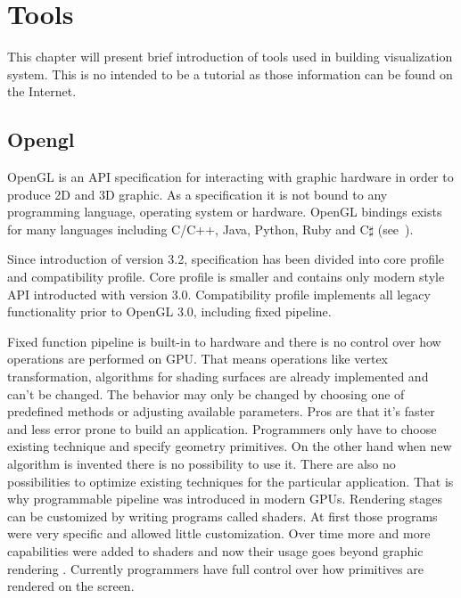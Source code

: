 

\chapter{Tools}


\graphicspath{{tools/figures/}}


This chapter will present brief introduction of tools used in building visualization system. This is no intended to be a tutorial as those information can be found on the Internet. 

\section{Opengl}
OpenGL is an API specification for interacting with graphic hardware in order to produce 2D and 3D graphic. 
As a specification it is not bound to any programming language, operating system or hardware. 
OpenGL bindings exists for many languages including C/C++, Java, Python, Ruby and C$\sharp$ (see~\cite{OglBindings}). 

Since introduction of version 3.2, specification has been divided into core profile and compatibility profile. Core profile is smaller and contains only modern style API introducted with version 3.0. Compatibility profile implements all legacy functionality prior to OpenGL 3.0, including fixed pipeline. 

Fixed function pipeline is built-in to hardware and there is no control over how operations are performed on GPU. That means operations like vertex transformation, algorithms for shading surfaces are already implemented and can't be changed. The behavior may only be changed by choosing one of predefined methods or adjusting available parameters. Pros are that it's faster and less error prone to build an application. Programmers only have to choose existing technique and specify geometry primitives. On the other hand when new algorithm is invented there is no possibility to use it. There are also no possibilities to optimize existing techniques for the particular application. 
That is why programmable pipeline was introduced in modern GPUs. Rendering stages can be customized by writing programs called shaders. At first those programs were very specific and allowed little customization. Over time more and more capabilities were added to shaders and now their usage goes beyond graphic rendering \cite[Part~VI]{GPUGems3}. Currently programmers have full control over how primitives are rendered on the screen.

